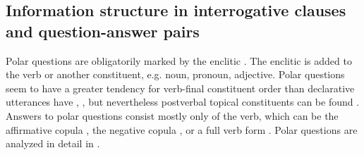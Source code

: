 
\subsection{Information structure in interrogative clauses and question-answer pairs}
\label{ssec:Information structure in interrogative clauses and question-answer pairs}

Polar questions are obligatorily marked by the enclitic . The enclitic is added to the verb or another constituent, e.g. noun, pronoun, adjective. Polar questions seem to have a greater tendency for verb-final constituent order than declarative utterances have , , but nevertheless postverbal topical constituents can be found . Answers to polar questions consist mostly only of the verb, which can be the affirmative copula , the negative copula , or a full verb form . Polar questions are analyzed in detail in .
%
